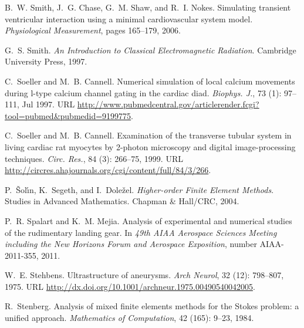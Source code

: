 \begin{thebibliography}{467}
B.~W. Smith, J.~G. Chase, G.~M. Shaw, and R.~I. Nokes.
\newblock Simulating transient ventricular interaction using a minimal
  cardiovascular system model.
\newblock \emph{Physiological Measurement}, pages 165--179, 2006.

G.~S. Smith.
\newblock \emph{An Introduction to Classical Electromagnetic Radiation}.
\newblock Cambridge University Press, 1997.

C.~Soeller and M.~B. Cannell.
\newblock Numerical simulation of local calcium movements during l-type calcium
  channel gating in the cardiac diad.
\newblock \emph{Biophys. J.}, 73 (1): 97--111, Jul 1997.
\newblock URL
  \url{http://www.pubmedcentral.gov/articlerender.fcgi?tool=pubmed&pubmedid=9199775}.

C.~Soeller and M.~B. Cannell.
\newblock Examination of the transverse tubular system in living cardiac rat
  myocytes by 2-photon microscopy and digital image-processing techniques.
\newblock \emph{Circ. Res.}, 84 (3): 266--75, 1999.
\newblock URL \url{http://circres.ahajournals.org/cgi/content/full/84/3/266}.

P.~{\v{S}}ol{\'{\i}}n, K.~Segeth, and I.~Dole{\v{z}}el.
\newblock \emph{Higher-order Finite Element Methods}.
\newblock Studies in Advanced Mathematics. Chapman \& Hall/CRC, 2004.

P.~R. Spalart and K.~M. Mejia.
\newblock Analysis of experimental and numerical studies of the rudimentary
  landing gear.
\newblock In \emph{49th AIAA Aerospace Sciences Meeting including the New
  Horizons Forum and Aerospace Exposition}, number AIAA-2011-355, 2011.

W.~E. Stehbens.
\newblock Ultrastructure of aneurysms.
\newblock \emph{Arch Neurol}, 32 (12): 798--807, 1975.
\newblock URL \url{http://dx.doi.org/10.1001/archneur.1975.00490540042005}.

R.~Stenberg.
\newblock Analysis of mixed finite elements methods for the {S}tokes problem: a
  unified approach.
\newblock \emph{Mathematics of Computation}, 42 (165): 9--23,
  1984.


\end{thebibliography}

